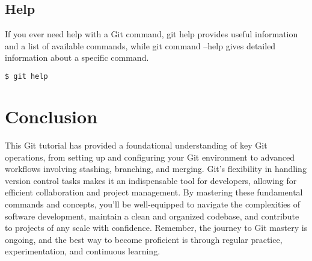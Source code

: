 \documentclass[10pt,twocolumn]{article}
\begin{document}
\subsection{Help}
If you ever need help with a Git command, git help provides useful information and a list of available commands, while git command --help gives detailed information about a specific command.
\begin{lstlisting}[language=bash]
    $ git help
    \end{lstlisting}
\section{Conclusion}
This Git tutorial has provided a foundational understanding of key Git operations, from setting up and configuring your Git environment to advanced workflows involving stashing, branching, and merging. Git's flexibility in handling version control tasks makes it an indispensable tool for developers, allowing for efficient collaboration and project management. By mastering these fundamental commands and concepts, you'll be well-equipped to navigate the complexities of software development, maintain a clean and organized codebase, and contribute to projects of any scale with confidence. Remember, the journey to Git mastery is ongoing, and the best way to become proficient is through regular practice, experimentation, and continuous learning.
\end{document}
